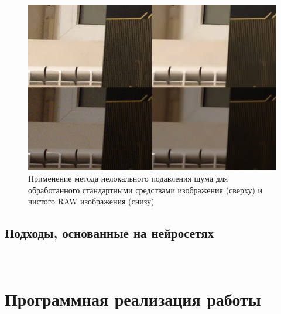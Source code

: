 \begin{figure}[h]
	\centering
	\includegraphics[width=\textwidth]{img/nlmdenoising_comparison}
	\caption{Применение метода нелокального подавления шума для обработанного стандартными средствами изображения (сверху) и чистого RAW изображения (снизу)}
	\label{fig:nlmdenoising_comparison}
\end{figure}

\subsection{Подходы, основанные на нейросетях}


\appendix
\section{\\Программная реализация работы}



